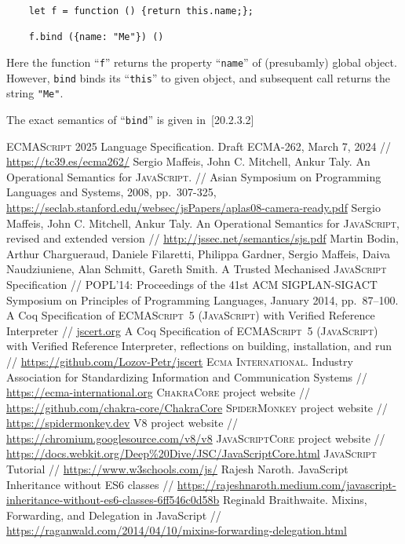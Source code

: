 \documentclass{article}
\newcommand{\js}{\textsc{JavaScript}\xspace}
\newcommand{\es}{\textsc{ECMAScript}\xspace}
\newcommand{\ecma}{\textsc{Ecma International}\xspace}
\newcommand{\rf}[1]{[\textsc{#1}]}
\begin{document}
\begin{lstlisting}
    let f = function () {return this.name;};

    f.bind ({name: "Me"}) ()
\end{lstlisting}

Here the function ``\lstinline|f|'' returns the property ``\lstinline|name|'' of (presubamly)
global object. However, \lstinline|bind| binds its ``\lstinline|this|'' to given object, and
subsequent call returns the string \lstinline|"Me"|.

The exact semantics of ``\lstinline|bind|'' is given in~\rf{20.2.3.2}


\begin{thebibliography}{99}
  \es\textsuperscript{\textregistered} 2025 Language Specification. Draft ECMA-262, March 7, 2024 //
  \url{https://tc39.es/ecma262/}
  Sergio Maffeis, John C. Mitchell, Ankur Taly. An Operational Semantics for \js. // Asian Symposium on Programming Languages and Systems, 2008, pp.~307-325,
  \url{https://seclab.stanford.edu/websec/jsPapers/aplas08-camera-ready.pdf}
  Sergio Maffeis, John C. Mitchell, Ankur Taly. An Operational Semantics for \js, revised and extended version // \url{http://jssec.net/semantics/sjs.pdf}
  Martin Bodin, Arthur Chargueraud, Daniele Filaretti, Philippa Gardner, Sergio Maffeis, Daiva Naudziuniene, Alan Schmitt, Gareth Smith. A Trusted Mechanised \js Specification //
  POPL'14: Proceedings of the 41st ACM SIGPLAN-SIGACT Symposium on Principles of Programming Languages, January 2014, pp.~87–100.
  A Coq Specification of \es~5 (\js) with Verified Reference Interpreter // \url{jscert.org}
  A Coq Specification of \es~5 (\js) with Verified Reference Interpreter, reflections on building, installation, and run // \url{https://github.com/Lozov-Petr/jscert}  
 \ecma. Industry Association for Standardizing Information and Communication Systems // \url{https://ecma-international.org}
 \textsc{ChakraCore} project website // \url{https://github.com/chakra-core/ChakraCore}
 \textsc{SpiderMonkey} project website // \url{https://spidermonkey.dev}
 \textsc{V8} project website // \url{https://chromium.googlesource.com/v8/v8}
 \textsc{JavaScriptCore} project website // \url{https://docs.webkit.org/Deep%20Dive/JSC/JavaScriptCore.html}
 \js Tutorial // \url{https://www.w3schools.com/js/}
 Rajesh Naroth. JavaScript Inheritance without ES6 classes // \url{https://rajeshnaroth.medium.com/javascript-inheritance-without-es6-classes-6ff546c0d58b}
 Reginald Braithwaite. Mixins, Forwarding, and Delegation in JavaScript // \url{https://raganwald.com/2014/04/10/mixins-forwarding-delegation.html}
\end{thebibliography}
\end{document}
